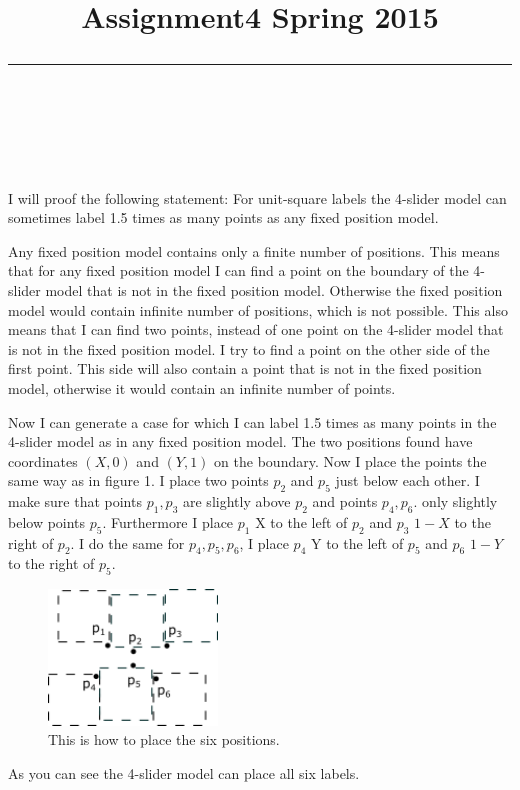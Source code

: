 \documentclass[a4paper,twoside,11pt]{article}
\title{\vspace{-2.8\baselineskip}\Large\sffamily\bfseries\raggedright
Assignment4  \hfill Spring 2015\\ \vspace{-.5\baselineskip}\rule{\linewidth}{1pt}\\
}
\date{}
\newcommand{\exercise}[1]{\noindent{\bf Exercise #1:}}
\begin{document}
\maketitle
\vspace{-2\baselineskip}


\exercise{1}
I will proof the following statement: For unit-square labels the 4-slider model can sometimes label 1.5 times as many points as any fixed position model.

Any fixed position model contains only a finite number of positions. 
This means that for any fixed position model I can find a point on the boundary of the 4-slider model that is not in the fixed position model. 
Otherwise the fixed position model would contain infinite number of positions, which is not possible. 
This also means that I can find two points, instead of one point on the 4-slider model that is not in the fixed position model. 
I try to find a point on the other side of the first point. 
This side will also contain a point that is not in the fixed position model, otherwise it would contain an infinite number of points. 

Now I can generate a case for which I can label 1.5 times as many points in the 4-slider model as in any fixed position model. 
The two positions found have coordinates $(X,0)$ and $(Y,1)$ on the boundary. 
Now I place the points the same way as in figure 1. 
I place two points $p_{2}$ and $p_{5}$ just below each other. 
I make sure that points $p_{1}, p_{3}$ are slightly above $p_{2}$ and  points $p_{4}, p_{6}$. only slightly below points $ p_{5}$.
Furthermore I place $p_{1}$ X to the left of $p_{2}$ and $p_{3}$  $1-X$ to the right of $p_{2}$. 
I do the same for $p_{4}, p_{5}, p_{6}$, I place $p_{4}$ Y to the left of $p_{5}$ and $p_{6}$  $1-Y$ to the right of $p_{5}$.
\begin{figure}[H]
	\centering
	\includegraphics[width=0.4\textwidth]{A41a.png}
	\caption{ This is how to place the six positions. }
\end{figure}

As you can see the 4-slider model can place all six labels. 
\end{document}
